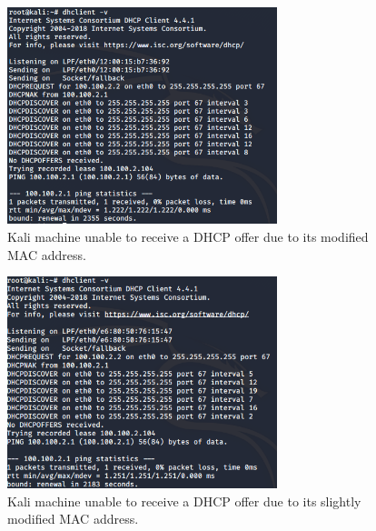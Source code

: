 \begin{figure}[htpb]
\centering
\includegraphics[width=0.7\textwidth]{dhcp_kali_macNotOk.png}
\caption[a]{Kali machine unable to receive a DHCP offer due to its modified MAC address.}\label{fig:7}
\end{figure}

\begin{figure}[htpb]
\centering
\includegraphics[width=0.7\textwidth]{dhcp_kali_macNotOk2.png}
\caption[a]{Kali machine unable to receive a DHCP offer due to its slightly modified MAC address.}\label{fig:8}
\end{figure}
